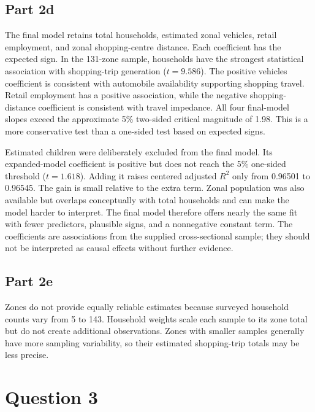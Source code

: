 \documentclass[11pt]{article}
\begin{document}
\subsection{Part 2d}
The final model retains total households, estimated zonal vehicles, retail employment, and zonal shopping-centre distance. Each coefficient has the expected sign. In the 131-zone sample, households have the strongest statistical association with shopping-trip generation ($t=9.586$). The positive vehicles coefficient is consistent with automobile availability supporting shopping travel. Retail employment has a positive association, while the negative shopping-distance coefficient is consistent with travel impedance. All four final-model slopes exceed the approximate 5\% two-sided critical magnitude of 1.98. This is a more conservative test than a one-sided test based on expected signs.

Estimated children were deliberately excluded from the final model. Its expanded-model coefficient is positive but does not reach the 5\% one-sided threshold ($t=1.618$). Adding it raises centered adjusted $R^2$ only from 0.96501 to 0.96545. The gain is small relative to the extra term. Zonal population was also available but overlaps conceptually with total households and can make the model harder to interpret. The final model therefore offers nearly the same fit with fewer predictors, plausible signs, and a nonnegative constant term. The coefficients are associations from the supplied cross-sectional sample; they should not be interpreted as causal effects without further evidence.
\subsection{Part 2e}
Zones do not provide equally reliable estimates because surveyed household counts vary from 5 to 143. Household weights scale each sample to its zone total but do not create additional observations. Zones with smaller samples generally have more sampling variability, so their estimated shopping-trip totals may be less precise.
\newpage
\section{Question 3}
\end{document}

